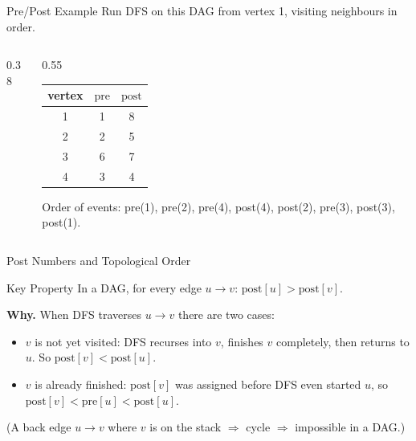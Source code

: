 \documentclass[10pt,aspectratio=169]{beamer}
\begin{document}
\begin{frame}{Pre/Post Example}
  Run DFS on this DAG from vertex 1, visiting neighbours in order.

  \bigskip
  \begin{columns}[c]
    \begin{column}{0.38\textwidth}
      \begin{center}
      \end{center}
    \end{column}
    \begin{column}{0.55\textwidth}
      \begin{center}
      \begin{tabular}{ccc}
        \toprule
        vertex & $\mathrm{pre}$ & $\mathrm{post}$ \\
        \midrule
        1 & 1 & 8 \\
        2 & 2 & 5 \\
        3 & 6 & 7 \\
        4 & 3 & 4 \\
        \bottomrule
      \end{tabular}
      \end{center}

      \bigskip
      Order of events: pre(1), pre(2), pre(4), post(4), post(2), pre(3), post(3), post(1).
    \end{column}
  \end{columns}
\end{frame}

\begin{frame}{Post Numbers and Topological Order}
  \begin{block}{Key Property}
    In a DAG, for every edge $u \to v$: \quad $\mathrm{post}[u] > \mathrm{post}[v]$.
  \end{block}

  \bigskip
  \textbf{Why.} When DFS traverses $u \to v$ there are two cases:
  \begin{itemize}
    \item $v$ is \alert{not yet visited}: DFS recurses into $v$, finishes $v$
          completely, then returns to $u$. So $\mathrm{post}[v] < \mathrm{post}[u]$.
    \item $v$ is \alert{already finished}: $\mathrm{post}[v]$ was assigned before
          DFS even started $u$, so $\mathrm{post}[v] < \mathrm{pre}[u] < \mathrm{post}[u]$.
  \end{itemize}
  (A back edge $u \to v$ where $v$ is on the stack $\Rightarrow$ cycle $\Rightarrow$
  impossible in a DAG.)
\end{frame}
\end{document}
